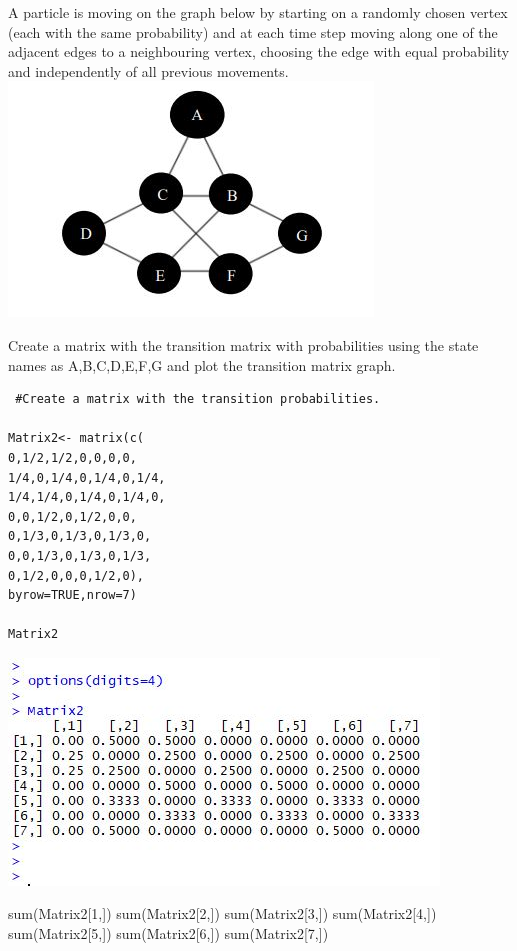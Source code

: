 \documentclass[a4paper,12pt]{article}
\begin{document}
\large 
\noindent A particle is moving on the graph below by starting on a randomly chosen vertex (each with
the same probability) and at each time step moving along one of the adjacent edges to a
neighbouring vertex, choosing the edge with equal probability and independently of all
previous movements.
\includegraphics[]{00-B2/images/B2-Q5-Graph.JPG}




\newpage 
Create a matrix with the transition matrix with probabilities using the state names as
{A,B,C,D,E,F,G} and plot the transition matrix graph. 
\begin{framed}\begin{verbatim}
 #Create a matrix with the transition probabilities.

Matrix2<- matrix(c(
0,1/2,1/2,0,0,0,0,
1/4,0,1/4,0,1/4,0,1/4,
1/4,1/4,0,1/4,0,1/4,0,
0,0,1/2,0,1/2,0,0,
0,1/3,0,1/3,0,1/3,0,
0,0,1/3,0,1/3,0,1/3,
0,1/2,0,0,0,1/2,0),
byrow=TRUE,nrow=7)

Matrix2

\end{verbatim}\end{framed}

\includegraphics[]{00-B2/images/TransitionMatrix.JPG}


\begin{framed}
sum(Matrix2[1,])
sum(Matrix2[2,])
sum(Matrix2[3,])
sum(Matrix2[4,])
sum(Matrix2[5,])
sum(Matrix2[6,])
sum(Matrix2[7,])
\end{framed}
\end{document}
